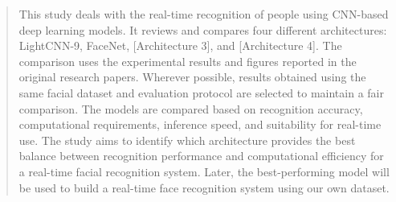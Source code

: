 \documentclass[11pt,a4paper,twocolumn]{article}
\begin{document}




\begin{abstract}

This study deals with the real-time recognition of people using CNN-based deep learning models. It reviews and compares four different architectures: LightCNN-9, FaceNet, [Architecture 3], and [Architecture 4]. The comparison uses the experimental results and figures reported in the original research papers. Wherever possible, results obtained using the same facial dataset and evaluation protocol are selected to maintain a fair comparison. The models are compared based on recognition accuracy, computational requirements, inference speed, and suitability for real-time use. The study aims to identify which architecture provides the best balance between recognition performance and computational efficiency for a real-time facial recognition system. Later, the best-performing model will be used to build a real-time face recognition system using our own dataset.

\end{abstract}
\end{document}
